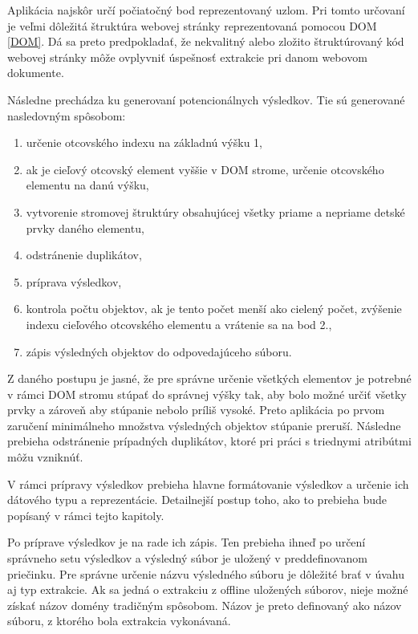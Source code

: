 Aplikácia najskôr určí počiatočný bod reprezentovaný uzlom. Pri tomto určovaní je veľmi dôležitá štruktúra webovej stránky reprezentovaná pomocou DOM \ref{DOM}. Dá sa preto predpokladať, že nekvalitný alebo zložito štruktúrovaný kód webovej stránky môže ovplyvniť úspešnosť extrakcie pri danom webovom dokumente. 

Následne prechádza ku generovaní potencionálnych výsledkov. Tie sú generované nasledovným spôsobom:

\bigskip

\begin{enumerate}
    \item určenie otcovského indexu na základnú výšku 1,
    \item ak je cieľový otcovský element vyššie v DOM strome, určenie otcovského elementu na danú výšku,
    \item vytvorenie stromovej štruktúry obsahujúcej všetky priame a nepriame detské prvky daného elementu,
    \item odstránenie duplikátov,
    \item príprava výsledkov,
    \item kontrola počtu objektov, ak je tento počet menší ako cielený počet, zvýšenie indexu cieľového otcovského elementu a vrátenie sa na bod 2.,
    \item zápis výsledných objektov do odpovedajúceho súboru.
\end{enumerate}

\bigskip

Z daného postupu je jasné, že pre správne určenie všetkých elementov je potrebné v rámci DOM stromu stúpať do správnej výšky tak, aby bolo možné určiť všetky prvky a zároveň aby stúpanie nebolo príliš vysoké. Preto aplikácia po prvom zaručení minimálneho množstva výsledných objektov stúpanie preruší. Následne prebieha odstránenie prípadných duplikátov, ktoré pri práci s triednymi atribútmi môžu vzniknúť.

V rámci prípravy výsledkov prebieha hlavne formátovanie výsledkov a určenie ich dátového typu a reprezentácie. Detailnejší postup toho, ako to prebieha bude popísaný v rámci tejto kapitoly. 

Po príprave výsledkov je na rade ich zápis. Ten prebieha ihneď po určení správneho setu výsledkov a výsledný súbor je uložený v preddefinovanom priečinku. Pre správne určenie názvu výsledného súboru je dôležité brať v úvahu aj typ extrakcie. Ak sa jedná o extrakciu z offline uložených súborov, nieje možné získať názov domény tradičným spôsobom. Názov je preto definovaný ako názov súboru, z ktorého bola extrakcia vykonávaná. 

